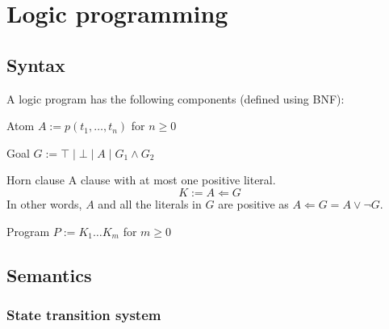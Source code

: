 \chapter{Logic programming}


\section{Syntax}

A logic program has the following components (defined using BNF):
\begin{descriptionlist}
    \item[Atom] 
        $A := p(t_1, \dots, t_n)$ for $n \geq 0$
    
    \item[Goal] 
        $G := \top \mid \bot \mid A \mid G_1 \land G_2$
    
    \item[Horn clause] 
        A clause with at most one positive literal.
        \[ K := A \Leftarrow G \]
        In other words, $A$ and all the literals in $G$ are positive as $A \Leftarrow G = A \vee \lnot G$.
    
    \item[Program] 
        $P := K_1 \dots K_m$ for $m \geq 0$
\end{descriptionlist}



\section{Semantics}

\subsection{State transition system}

